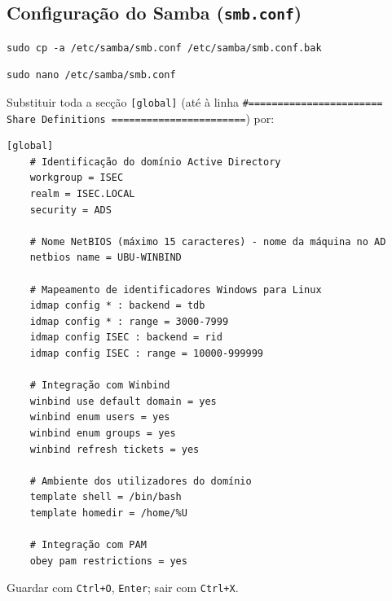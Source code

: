 
\subsection[Configuração do Samba (smb.conf)]{Configuração do Samba (\texttt{smb.conf})}



\begin{lstlisting}[style=bashstyle]
sudo cp -a /etc/samba/smb.conf /etc/samba/smb.conf.bak
\end{lstlisting}


\begin{lstlisting}[style=bashstyle]
sudo nano /etc/samba/smb.conf
\end{lstlisting}

Substituir toda a secção \texttt{[global]} (até à linha \texttt{\#======================= Share Definitions =======================}) por:

\begin{lstlisting}[style=cfgstyle]
[global]
    # Identificação do domínio Active Directory
    workgroup = ISEC
    realm = ISEC.LOCAL
    security = ADS

    # Nome NetBIOS (máximo 15 caracteres) - nome da máquina no AD
    netbios name = UBU-WINBIND

    # Mapeamento de identificadores Windows para Linux
    idmap config * : backend = tdb
    idmap config * : range = 3000-7999
    idmap config ISEC : backend = rid
    idmap config ISEC : range = 10000-999999

    # Integração com Winbind
    winbind use default domain = yes
    winbind enum users = yes
    winbind enum groups = yes
    winbind refresh tickets = yes

    # Ambiente dos utilizadores do domínio
    template shell = /bin/bash
    template homedir = /home/%U

    # Integração com PAM
    obey pam restrictions = yes
\end{lstlisting}

Guardar com \texttt{Ctrl+O}, \texttt{Enter}; sair com \texttt{Ctrl+X}.


